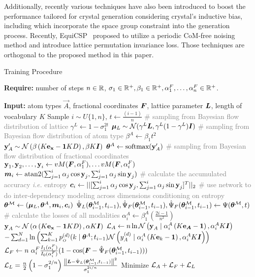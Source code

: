  Additionally, recently various techniques have also been introduced to boost the performance tailored for crystal generation considering crystal's inductive bias, including \citet{jiao2024space,cao2024space,ai4science2023crystal} which incorporate the space group constraint into the generation process. Recently, EquiCSP~\citep{equicsp} proposed to utilize a periodic CoM-free noising method and introduce lattice permutation invariance loss. Those techniques are orthogonal to the proposed method in this paper.




 \begin{algorithm}[h]
\small
\caption{Training Procedure}\label{alg:train}
\begin{algorithmic}[1]
\STATE \textbf{Require:} number of steps $n\in\R$, $\sigma_1\in\R^{+},\beta_1\in\R^{+},\alpha_1^F,\dots,\alpha_n^F\in\R^{+}$. 

\STATE \textbf{Input:}  atom types $\vec{A}$, fractional coordinates $\vF$, lattice parameter $\vL$, length of vocabulary $K$
\STATE Sample $i\sim U\{1,n\}$, $t\leftarrow \frac{(i-1)}{n}$
\STATE \textcolor{gray}{\# sampling from Bayesian flow distribution of lattice}
\STATE $\gamma^L \leftarrow 1-\sigma_1^{2t}$
\STATE $\vmu_L\sim\mathcal{N}(\gamma^L \vL,\gamma^L(1-\gamma^L)\vI)$
\STATE \textcolor{gray}{\# sampling from Bayesian flow distribution of atom type}
\STATE $\beta^A \leftarrow \beta_1 t^2$
\STATE $\y_A' \sim \N{\beta\left(K\oh{\x}{KD}-
\1{KD}\right)}{\beta K\vI}$
\STATE $\parsn^A \gets \text{softmax}(\y_A')$
\STATE \textcolor{gray}{\# sampling from Bayesian flow distribution of fractional coordinates}
\STATE $\y_1,\y_2,\dots,\y_i \gets vM(\vF,\alpha_1^F),\dots vM(\vF,\alpha_i^F)$
\STATE $\vec{m}_{i}\gets\text{atan2}(\sum_{j=1}^i \alpha_j \cos \y_j,\sum_{j=1}^i \alpha_j \sin \y_j)$
\STATE \textcolor{gray}{\# calculate the accumulated accuracy \textit{i.e.} entropy}
\STATE $\vec{c}_{i}\gets ||[\sum_{j=1}^i \alpha_j\cos \y_j,\sum_{j=1}^i \alpha_j\sin \y_j]^T||_2$
\STATE \textcolor{gray}{\# use network to do inter-dependency modeling across dimensions conditioning on entropy}
\STATE $\bthetaM\gets (\vmu_L,\parsn^A,\vec{m}_{i},\vec{c}_{i})$
\STATE $\predL{i-1},\predF{i-1},\predF{i-1} \gets \net(\bthetaM,t)$ 
\STATE \textcolor{gray}{\# calculate the losses of all modalities }
\STATE $\alpha^A_i \leftarrow \beta_1^A\left(\frac{2i -1}{n^2}\right)$
\STATE $\y_A \sim \N{\alpha\left(K\oh{\x}{KD}-
\1{KD}\right)}{\alpha K\vI}$
\STATE $\calL_A \gets n\ln \N{\y_A \mid \alphat{i}^A\left(K \oh{\vA}{K\times N} - \vec{1}\right)}{\alphat{i}^A K \vec{I}}$
\STATE\qquad\qquad$-\sum_{d=1}^N \ln \left(\sum_{k=1}^K \out^{(d)}(k \mid \parsn^A; t_{i-1}) \N{\ydd{d}_A \mid \alphat{i}^A\left(K\oh{k}{K}- \vec{1}\right)}{\alphat{i}^A K \vec{I}}\right)$
\STATE $\calL_F \gets n~\alpha_i^F\frac{I_1(\alpha_i^F)}{I_0(\alpha_i^F)}(1-\cos(\vF-\predF{i-1}))$
\STATE $\mathcal{L}_{L} = \frac{n}{2}\left(1-\sigma_1^{2/n}\right)\frac{\left\|\vL -\predL{i-1}\right\|^2}{\sigma_1^{2i/n}}$
\STATE Minimize $\calL_A+\calL_F+\calL_L$
\end{algorithmic}
\end{algorithm}

